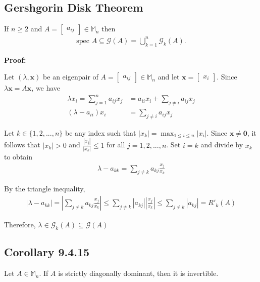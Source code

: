 \documentclass[12pt, letterpaper]{article}
\begin{document}
\newpage
\subsection{Gershgorin Disk Theorem}
If $n \ge 2$ and $A=\begin{bmatrix}
    a_{ij}
\end{bmatrix} \in \mathbb{M}_n$ then
\begin{align*}
    \text{spec } A \subseteq \mathcal{G}(A)= \bigcup^n_{k=1} \mathcal{G}_k(A).
\end{align*}

\noindent\textbf{Proof:}

Let $(\lambda,\mathbf{x})$ be an eigenpair of $A = \begin{bmatrix}
a_{ij} 
\end{bmatrix} \in \mathbb{M}_n$ and let $\mathbf{x}=\begin{bmatrix}
    x_i
\end{bmatrix}$. Since $\lambda \mathbf{x}=A\mathbf{x}$, we have
\begin{align*}
    \lambda x_i = \displaystyle\sum^n_{j=1} a_{ij}x_j &= a_{ii}x_i+\displaystyle\sum_{j\ne i} a_{ij}x_j \\
    (\lambda - a_{ii})x_i &= \displaystyle\sum_{j\ne i} a_{ij}x_j 
\end{align*}

Let $k \in \{ 1,2,...,n \}$ be any index such that $|x_k|=\max_{1\le i \le n} |x_i|$. Since $\mathbf{x} \ne \mathbf{0}$, 
it follows that $|x_k|>0$ and $\frac{|x_j|}{|x_k|}\le 1$ for all $j = 1,2,...,n$. Set $i = k$ and divide by $x_k$ to obtain
\begin{align*}
    \lambda - a_{kk} = \displaystyle\sum_{j\ne k} a_{kj} \frac{x_j}{x_k}
\end{align*}

By the triangle inequality,
\begin{align*}
    |\lambda-a_{kk}|=\left| \displaystyle\sum_{j\ne k}a_{kj}\frac{x_j}{x_k} \right| \le \sum_{j\ne k} |a_{kj}| \left| \frac{x_j}{x_k} \right| \le \sum_{j\ne k} |a_{kj}| = R'_k(A)
\end{align*}

Therefore, $\lambda \in \mathcal{G}_k(A)\subseteq \mathcal{G}(A)$

\subsection{Corollary 9.4.15}
Let $A\in \mathbb{M}_n$. If $A$ is strictly diagonally dominant, then it is invertible. \\
\end{document}
